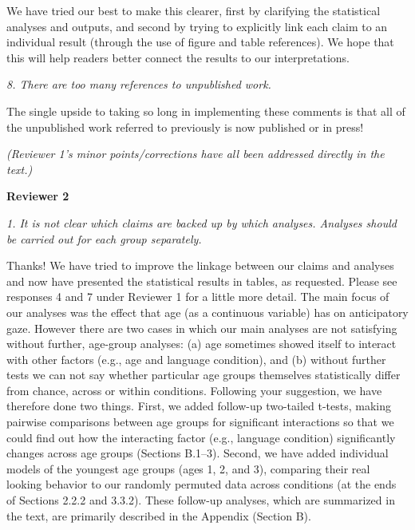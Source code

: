 \documentclass[11pt,a4paper]{letter} %
\begin{document}
\begin{letter}{}
\noindent We have tried our best to make this clearer, first by clarifying the statistical analyses and outputs, and second by trying to explicitly link each claim to an individual result (through the use of figure and table references). We hope that this will help readers better connect the results to our interpretations.

\smallskip

\noindent \textit{8. There are too many references to unpublished work.}

\noindent The single upside to taking so long in implementing these comments is that all of the unpublished work referred to previously is now published or in press!

\smallskip

\noindent \textit{(Reviewer 1's minor points/corrections have all been addressed directly in the text.)}

\bigskip

\noindent \textbf{Reviewer 2}

\noindent \textit{1. It is not clear which claims are backed up by which analyses. Analyses should be carried out for each group separately.}

\noindent Thanks! We have tried to improve the linkage between our claims and analyses and now have presented the statistical results in tables, as requested. Please see responses 4 and 7 under Reviewer 1 for a little more detail. The main focus of our analyses was the effect that age (as a continuous variable) has on anticipatory gaze. However there are two cases in which our main analyses are not satisfying without further, age-group analyses: (a) age sometimes showed itself to interact with other factors (e.g., age and language condition), and (b) without further tests we can not say whether particular age groups themselves statistically differ from chance, across or within conditions. Following your suggestion, we have therefore done two things. First, we added follow-up two-tailed t-tests, making pairwise comparisons between age groups for significant interactions so that we could find out how the interacting factor (e.g., language condition) significantly changes across age groups (Sections B.1--3). Second, we have added individual models of the youngest age groups (ages 1, 2, and 3), comparing their real looking behavior to our randomly permuted data across conditions (at the ends of Sections 2.2.2 and 3.3.2). These follow-up analyses, which are summarized in the text, are primarily described in the Appendix (Section B).


\end{letter}
\end{document}
